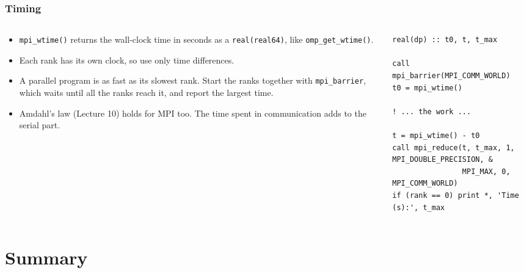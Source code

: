 \begin{frame}[fragile]
  \frametitle{Timing}
  \begin{columns}[T]
    \begin{column}{0.5\textwidth}
      \begin{itemize}
        \item \texttt{mpi\_wtime()} returns the wall-clock time in seconds as a \texttt{real(real64)}, like \texttt{omp\_get\_wtime()}.
        \item Each rank has its own clock, so use only time differences.
        \item A parallel program is as fast as its slowest rank. Start the ranks together with \texttt{mpi\_barrier}, which waits until all the ranks reach it, and report the largest time.
        \item Amdahl's law (Lecture 10) holds for MPI too. The time spent in communication adds to the serial part.
      \end{itemize}
    \end{column}

    \begin{column}{0.5\textwidth}
\begin{lstlisting}
real(dp) :: t0, t, t_max

call mpi_barrier(MPI_COMM_WORLD)
t0 = mpi_wtime()

! ... the work ...

t = mpi_wtime() - t0
call mpi_reduce(t, t_max, 1, MPI_DOUBLE_PRECISION, &
                MPI_MAX, 0, MPI_COMM_WORLD)
if (rank == 0) print *, 'Time (s):', t_max
\end{lstlisting}

    \end{column}
  \end{columns}
\end{frame}


\section{Summary}

